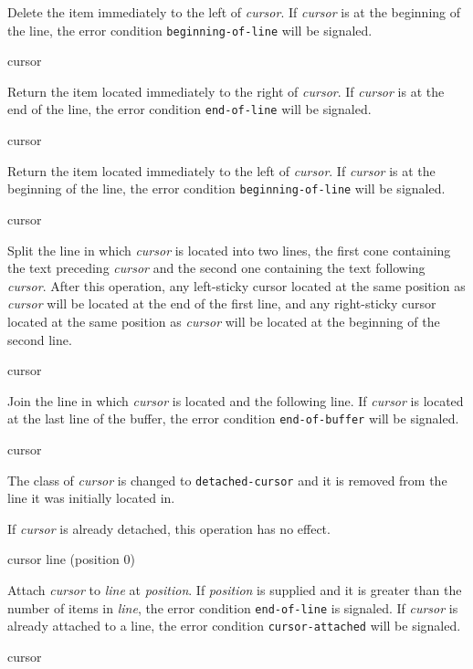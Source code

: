 Delete the item immediately to the left of \emph{cursor}.  If
\emph{cursor} is at the beginning of the line, the error condition
\texttt{beginning-of-line} will be signaled.

 {cursor}

Return the item located immediately to the right of \textit{cursor}.
If \emph{cursor} is at the end of the line, the error condition
\texttt{end-of-line} will be signaled.

 {cursor}

Return the item located immediately to the left of \textit{cursor}.
If \emph{cursor} is at the beginning of the line, the error condition
\texttt{beginning-of-line} will be signaled.

 {cursor}

Split the line in which \textit{cursor} is located into two lines, the
first cone containing the text preceding \textit{cursor} and the
second one containing the text following \textit{cursor}.  After this
operation, any left-sticky cursor located at the same position as
\textit{cursor} will be located at the end of the first line, and any
right-sticky cursor located at the same position as \textit{cursor}
will be located at the beginning of the second line.

 {cursor}

Join the line in which \textit{cursor} is located and the following
line.  If \textit{cursor} is located at the last line of the buffer,
the error condition \texttt{end-of-buffer} will be signaled.

 {cursor}

The class of \textit{cursor} is changed to \texttt{detached-cursor}
and it is removed from the line it was initially located in. 

If \textit{cursor} is already detached, this operation has no effect.

 {cursor line \optional (position 0)}

Attach \textit{cursor} to \textit{line} at \textit{position}.  If
\textit{position} is supplied and it is greater than the number of
items in \textit{line}, the error condition \texttt{end-of-line} is
signaled.  If \textit{cursor} is already attached to a line, the error
condition \texttt{cursor-attached} will be signaled.

 {cursor}

